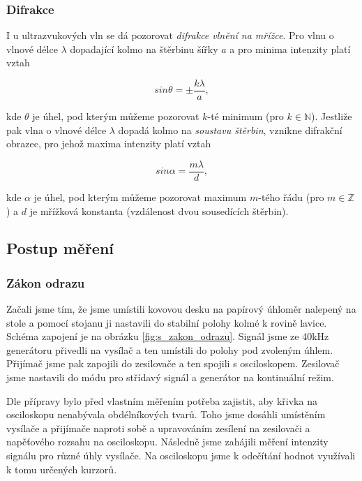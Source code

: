 \documentclass[english]{article}
\begin{document}
	\subsubsection{Difrakce}
		I u ultrazvukových vln se dá pozorovat \emph{difrakce vlnění na mřížce}. Pro vlnu o vlnové délce $\lambda$ dopadající kolmo na štěrbinu šířky $a$ a pro minima intenzity platí vztah 
		
		\begin{equation}
			sin\theta = \pm \frac{k\lambda}{a},
		\end{equation}
		
		kde $\theta$ je úhel, pod kterým můžeme pozorovat $k$-té minimum (pro $k \in \mathbb{N}$). Jestliže pak vlna o vlnové délce $\lambda$ dopadá kolmo na \emph{soustavu štěrbin}, vznikne difrakční obrazec, pro jehož maxima intenzity platí vztah
		
		\begin{equation}
			sin \alpha = \frac{m\lambda}{d},
		\end{equation}
		
		kde $\alpha$ je úhel, pod kterým můžeme pozorovat maximum $m$-tého řádu (pro $m \in \mathbb{Z}$) a $d$ je mřížková konstanta (vzdálenost dvou sousedících štěrbin).

\subsection{Postup měření}

	\subsubsection{Zákon odrazu}
		Začali jsme tím, že jsme umístili kovovou desku na papírový úhloměr nalepený na stole a pomocí stojanu ji nastavili do stabilní polohy kolmé k rovině lavice. Schéma zapojení je na obrázku \ref{fig:s_zakon_odrazu}. Signál jsme ze 40kHz generátoru přivedli na vysílač a ten umístili do polohy pod zvoleným úhlem. Přijímač jsme pak zapojili do zesilovače a ten spojili s osciloskopem. Zesilovač jsme nastavili do módu pro střídavý signál a generátor na kontinuální režim. 
		
		Dle přípravy bylo před vlastním měřením potřeba zajistit, aby křivka na osciloskopu nenabývala obdélníkových tvarů. Toho jsme dosáhli umístěním vysílače a přijímače naproti sobě a upravováním zesílení na zesilovači a napěťového rozsahu na osciloskopu. Následně jsme zahájili měření intenzity signálu pro různé úhly vysílače. Na osciloskopu jsme k odečítání hodnot využívali k tomu určených kurzorů.
		
\end{document}
